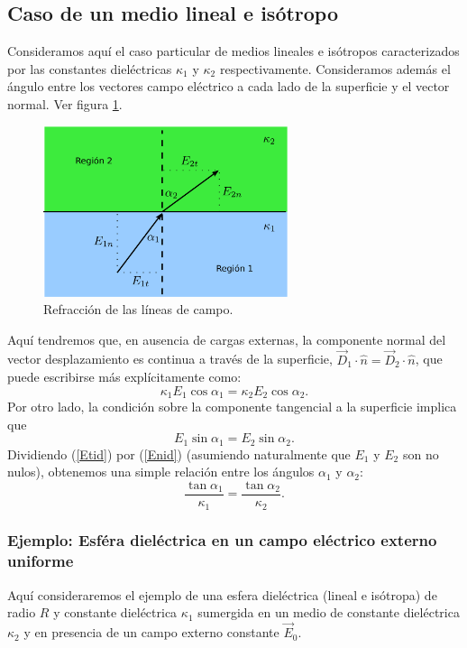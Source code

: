 \subsection{Caso de un medio lineal e isótropo}

Consideramos aquí el caso particular de medios lineales e isótropos caracterizados por las constantes dieléctricas $\kappa_1$ y $\kappa_2$ respectivamente. Consideramos además el ángulo entre los vectores campo eléctrico a cada lado de la superficie y el vector normal. Ver figura \ref{CF3}. 
\begin{figure}[!h]
\centerline{\includegraphics[height=5cm]{fig/fig-dielectrico-condicion-borde-03.pdf}}
\caption{Refracción de las líneas de campo.}
\label{CF3}
\end{figure}
Aquí tendremos que, en ausencia de cargas externas, la componente normal del vector desplazamiento es continua a través de la superficie,  $\vec{D}_1\cdot\hat{n}=\vec{D}_2\cdot\hat{n}$, que puede escribirse más explícitamente como:
\begin{equation}\label{Enid}
\kappa_1 E_1\cos\alpha_1=\kappa_2E_2\cos\alpha_2.
\end{equation}
Por otro lado, la condición sobre la componente tangencial a la superficie implica que
\begin{equation} \label{Etid}
 E_1\sin\alpha_1=E_2\sin\alpha_2.
\end{equation}
Dividiendo (\ref{Etid}) por (\ref{Enid}) (asumiendo naturalmente que $E_1$ y $E_2$ son no nulos), obtenemos una simple relación entre los ángulos $\alpha_1$ y $\alpha_2$:
\begin{equation}
 \frac{\tan\alpha_1}{\kappa_1}=\frac{\tan\alpha_2}{\kappa_2}.
\end{equation}

\subsubsection{Ejemplo: Esféra dieléctrica en un campo eléctrico externo uniforme}
Aquí consideraremos el ejemplo de una esfera dieléctrica (lineal e isótropa) de radio $R$ y constante dieléctrica $\kappa_1$ sumergida en un medio de constante dieléctrica $\kappa_2$ y en presencia de un campo externo constante $\vec{E}_0$.

